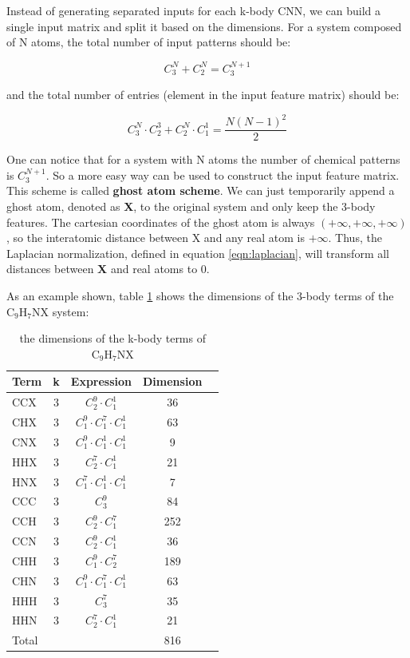\noindent Instead of generating separated inputs for each k-body CNN, we can build a single input 
matrix and split it based on the dimensions. For a system composed of N atoms, the total number
of input patterns should be:

\begin{equation}\label{eqn:cn3_cn2}
C^N_3 + C^N_2 = C^{N+1}_3
\end{equation}

\noindent and the total number of entries (element in the input feature matrix) should be:

\begin{equation}
C^N_3 \cdot C^3_2 + C^N_2 \cdot C^1_1 = \frac{N(N-1)^2}{2}
\end{equation}

One can notice that for a system with N atoms the number of chemical patterns is $C^{N+1}_3$.
So a more easy way can be used to construct the input feature matrix. This scheme is called
\textbf{ghost atom scheme}. We can just temporarily append a ghost atom, denoted as 
\textbf{X}, to the original system and only keep the 3-body features. 
The cartesian coordinates of the ghost atom is always $(+\infty, +\infty, +\infty)$, 
so the interatomic distance between X and any real atom is $+\infty$. Thus, the Laplacian 
normalization, defined in equation \ref{eqn:laplacian}, will transform all distances between 
\textbf{X} and real atoms to 0. 

As an example shown, table \ref{tab:table2} shows the 
dimensions of the 3-body terms of the $\mathrm{C}_9\mathrm{H}_7\mathrm{N}\mathrm{X}$ system: 
\begin{table}[h]
	\center
	\begin{tabular}{l*{3}{c}r}
		Term              & k & Expression & Dimension \\
		\hline
		CCX   & 3 & $C^9_2 \cdot C^1_1$             &  36 \\
		CHX   & 3 & $C^9_1 \cdot C^7_1 \cdot C^1_1$ &  63 \\
		CNX   & 3 & $C^9_1 \cdot C^1_1 \cdot C^1_1$ &   9 \\
		HHX   & 3 & $C^7_2 \cdot C^1_1$             &  21 \\
		HNX   & 3 & $C^7_1 \cdot C^1_1 \cdot C^1_1$ &   7 \\
		CCC   & 3 & $C^9_3$                         &  84 \\
		CCH   & 3 & $C^9_2 \cdot C^7_1$             & 252 \\
		CCN   & 3 & $C^9_2 \cdot C^1_1$             &  36 \\
		CHH   & 3 & $C^9_1 \cdot C^7_2$             & 189 \\
		CHN   & 3 & $C^9_1 \cdot C^7_1 \cdot C^1_1$ &  63 \\
		HHH   & 3 & $C^7_3$                         &  35 \\
		HHN   & 3 & $C^7_2 \cdot C^1_1$             &  21 \\
		Total &   &                                 & 816 
	\end{tabular}	
	\caption{
		the dimensions of the k-body terms of 
		$\mathrm{C}_9 \mathrm{H}_7 \mathrm{N} \mathrm{X}$
	}
	\label{tab:table2}
\end{table}

